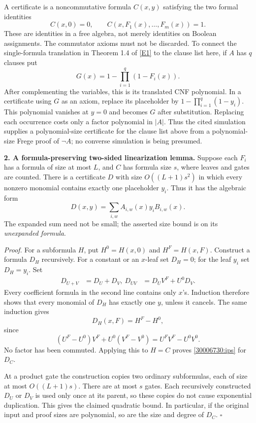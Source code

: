 \documentclass[11pt,a4paper]{article}
\newcommand{\eref}[2]{\hyperlink{extra:#1:#2}{[E#2]}}
\numberwithin{equation}{section}
\begin{document}
A certificate is a noncommutative formula $C(x,y)$ satisfying the two formal
identities
\begin{equation}\label{30006730:ips}
 C(x,0)=0,\qquad C(x,F_1(x),\ldots,F_m(x))=1.
\end{equation}
These are identities in a free algebra, not merely identities on Boolean
assignments. The commutator axioms must not be discarded. To connect the
single-formula translation in Theorem 1.4 of \eref{30006730}{1} to the clause
list here, if $A$ has $q$ clauses put
\[
 G(x)=1-\prod_{i=1}^{q}(1-F_i(x)).
\]
After complementing the variables, this is its translated CNF polynomial.
In a certificate using $G$ as an axiom, replace its placeholder by
$1-\prod_{i=1}^{q}(1-y_i)$. This polynomial vanishes at $y=0$ and becomes
$G$ after substitution. Replacing each occurrence costs only a factor
polynomial in $|A|$. Thus the cited simulation supplies a polynomial-size
certificate for the clause list above from a polynomial-size Frege proof
of $\neg A$; no converse simulation is being presumed.

\medskip
\textbf{2. A formula-preserving two-sided linearization lemma.}
Suppose each $F_i$ has a formula of size at most $L$, and $C$ has formula size
$s$, where leaves and gates are counted. There is a certificate $D$ with
size $O((L+1)s^2)$ in which every nonzero monomial contains exactly one
placeholder $y_i$. Thus it has the algebraic form
\begin{equation}\label{30006730:two-sided}
 D(x,y)=\sum_{i,w} A_{i,w}(x)y_iB_{i,w}(x).
\end{equation}
The expanded sum need not be small; the asserted size bound is on its
\emph{unexpanded formula}.

\emph{Proof.} For a subformula $H$, put $H^0=H(x,0)$ and $H^F=H(x,F)$.
Construct a formula $D_H$ recursively. For a constant or an $x$-leaf set
$D_H=0$; for the leaf $y_i$ set $D_H=y_i$. Set
\begin{align}
 D_{U+V}&=D_U+D_V,\
 D_{UV}&=D_U V^F+U^0D_V. \label{30006730:product}
\end{align}
Every coefficient formula in the second line contains only $x$'s. Induction
therefore shows that every monomial of $D_H$ has exactly one $y$, unless
it cancels. The same induction gives
\[
 D_H(x,F)=H^F-H^0,
\]
since
\[
 (U^F-U^0)V^F+U^0(V^F-V^0)=U^FV^F-U^0V^0.
\]
No factor has been commuted. Applying this to $H=C$ proves
\eqref{30006730:ips} for $D_C$.

At a product gate the construction copies two ordinary subformulas, each
of size at most $O((L+1)s)$. There are at most $s$ gates. Each recursively
constructed $D_U$ or $D_V$ is used only once at its parent, so these copies
do not cause exponential duplication. This gives the claimed quadratic
bound. In particular, if the original input and proof sizes are polynomial,
so are the size and degree of $D_C$. $\square$
\end{document}
